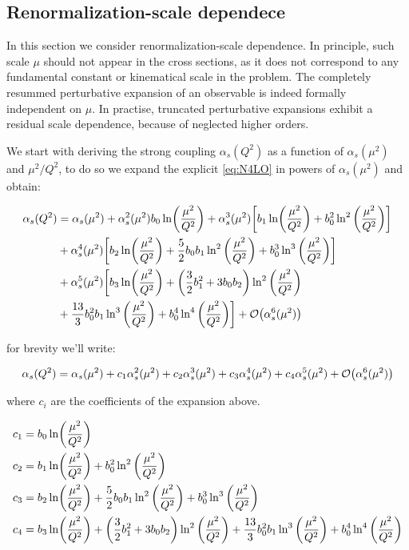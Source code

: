 \documentclass[../main.tex]{subfiles}
\begin{document}
\subsection{Renormalization-scale dependece}
In this section we consider renormalization-scale dependence. In principle, such scale $\mu$ should not appear in
the cross sections, as it does not correspond to any fundamental constant or kinematical scale in the problem.
The completely resummed perturbative expansion of an observable is indeed formally independent on $\mu$.
In practise, truncated perturbative expansions exhibit a residual scale dependence, because of neglected higher orders.

We start with deriving the strong coupling $\alpha_s (Q^2)$ as a function of $\alpha_s(\mu^2)$ and $\mu^2/Q^2$, to do so we expand 
the explicit \cref{eq:N4LO} in powers of $\alpha_s(\mu^2)$ and obtain:

\begin{align}
    \begin{split}\label{eq:renormalization scale dependence}
        \alpha_s(Q^2) &= \alpha_s(\mu^2) + \alpha_s^2(\mu^2) b_0 \ln(\frac{\mu^2}{Q^2}) + \alpha_s^3(\mu^2) \biggl[b_1 \ln(\frac{\mu^2}{Q^2}) + b_0^2 \ln^2\qty(\frac{\mu^2}{Q^2})\biggr] \\
        &+ \alpha_s^4 (\mu^2) \biggl[ b_2 \ln(\frac{\mu^2}{Q^2}) + \frac{5}{2} b_0 b_1 \ln^2\qty(\frac{\mu^2}{Q^2}) + b_0^3 \ln^3\qty(\frac{\mu^2}{Q^2})\biggr] \\
        &+ \alpha_s^5(\mu^2) \biggl[ b_3 \ln(\frac{\mu^2}{Q^2}) + \qty(\frac{3}{2} b_1^2 + 3 b_0 b_2 ) \ln^2\qty(\frac{\mu^2}{Q^2}) \\
        &+ \frac{13}{3} b_0^2 b_1 \ln^3\qty(\frac{\mu^2}{Q^2}) + b_0^4 \ln^4\qty(\frac{\mu^2}{Q^2}) \biggr] + \order{\alpha_s^6(\mu^2)}
    \end{split}
\end{align}

for brevity we'll write: 

\begin{equation}
    \alpha_s(Q^2) = \alpha_s(\mu^2) + c_1 \alpha_s^2(\mu^2) + c_2 \alpha_s^3(\mu^2) + c_3 \alpha_s^4(\mu^2) + c_4 \alpha_s^5(\mu^2) + \order{\alpha_s^6(\mu^2)} 
\end{equation}

where $c_i$ are the coefficients of the expansion above.

\begin{align}
    \begin{split}
        c_1 &= b_0 \ln(\frac{\mu^2}{Q^2}) \\
        c_2 &= b_1 \ln(\frac{\mu^2}{Q^2}) + b_0^2 \ln^2\qty(\frac{\mu^2}{Q^2}) \\
        c_3 &= b_2 \ln(\frac{\mu^2}{Q^2}) + \frac{5}{2} b_0 b_1 \ln^2\qty(\frac{\mu^2}{Q^2}) + b_0^3 \ln^3\qty(\frac{\mu^2}{Q^2}) \\
        c_4 &= b_3 \ln(\frac{\mu^2}{Q^2}) + \qty(\frac{3}{2} b_1^2 + 3 b_0 b_2 ) \ln^2\qty(\frac{\mu^2}{Q^2}) + \frac{13}{3} b_0^2 b_1 \ln^3\qty(\frac{\mu^2}{Q^2}) + b_0^4 \ln^4\qty(\frac{\mu^2}{Q^2})
    \end{split}
\end{align}
\end{document}
